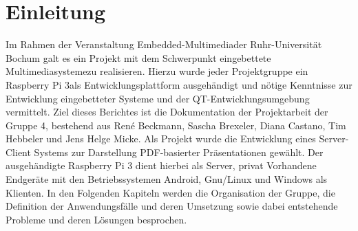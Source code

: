 \chapter{Einleitung}
\thispagestyle{fancy}
\label{[Einleitung]}
Im Rahmen der Veranstaltung \glqq Embedded-Multimedia\grqq der Ruhr-Universität Bochum galt es ein Projekt mit dem Schwerpunkt \glqq eingebettete Multimediasysteme\grqq zu realisieren.
Hierzu wurde jeder Projektgruppe ein \glqq Raspberry Pi 3\grqq als Entwicklungsplattform ausgehändigt und nötige Kenntnisse zur Entwicklung eingebetteter Systeme und der QT-Entwicklungsumgebung vermittelt.
Ziel dieses Berichtes ist die Dokumentation der Projektarbeit der Gruppe 4, bestehend aus René Beckmann, Sascha Brexeler, Diana Castano, Tim Hebbeler und Jens Helge Micke.
Als Projekt wurde die Entwicklung eines Server-Client Systems zur Darstellung PDF-basierter Präsentationen gewählt.
Der ausgehändigte \glqq Raspberry Pi 3 \grqq dient hierbei als Server, privat Vorhandene Endgeräte mit den Betriebssystemen Android, Gnu/Linux und Windows als Klienten.
In den Folgenden Kapiteln werden die Organisation der Gruppe, die Definition der Anwendungsfälle und deren Umsetzung sowie dabei entstehende Probleme und deren Lösungen besprochen.